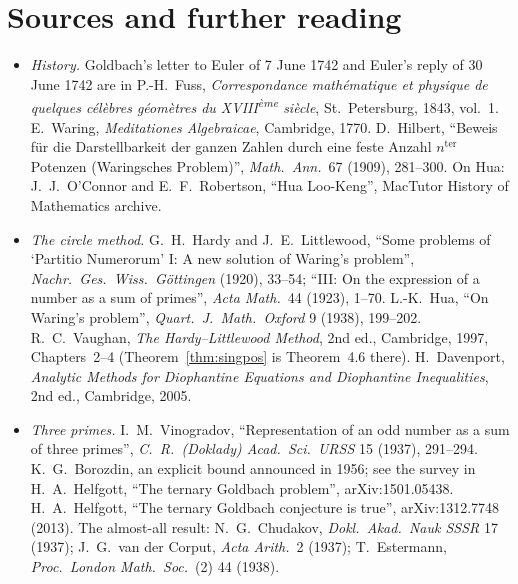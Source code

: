 \section*{Sources and further reading}

\begin{itemize}
\item \emph{History.} Goldbach's letter to Euler of 7 June 1742 and Euler's reply of 30 June 1742 are in P.-H.~Fuss, \emph{Correspondance mathématique et physique de quelques célèbres géomètres du XVIII\textsuperscript{ème} siècle}, St.\ Petersburg, 1843, vol.~1. E.~Waring, \emph{Meditationes Algebraicae}, Cambridge, 1770. D.~Hilbert, ``Beweis für die Darstellbarkeit der ganzen Zahlen durch eine feste Anzahl $n^{\text{ter}}$ Potenzen (Waringsches Problem)'', \emph{Math.\ Ann.}\ 67 (1909), 281--300. On Hua: J.~J.~O'Connor and E.~F.~Robertson, ``Hua Loo-Keng'', MacTutor History of Mathematics archive.
\item \emph{The circle method.} G.~H.~Hardy and J.~E.~Littlewood, ``Some problems of `Partitio Numerorum' I: A new solution of Waring's problem'', \emph{Nachr.\ Ges.\ Wiss.\ Göttingen} (1920), 33--54; ``III: On the expression of a number as a sum of primes'', \emph{Acta Math.}\ 44 (1923), 1--70. L.-K.~Hua, ``On Waring's problem'', \emph{Quart.\ J.\ Math.\ Oxford} 9 (1938), 199--202. R.~C.~Vaughan, \emph{The Hardy--Littlewood Method}, 2nd ed., Cambridge, 1997, Chapters~2--4 (Theorem~\ref{thm:singpos} is Theorem~4.6 there). H.~Davenport, \emph{Analytic Methods for Diophantine Equations and Diophantine Inequalities}, 2nd ed., Cambridge, 2005.
\item \emph{Three primes.} I.~M.~Vinogradov, ``Representation of an odd number as a sum of three primes'', \emph{C.\ R.\ (Doklady) Acad.\ Sci.\ URSS} 15 (1937), 291--294. K.~G.~Borozdin, an explicit bound announced in 1956; see the survey in H.~A.~Helfgott, ``The ternary Goldbach problem'', arXiv:1501.05438. H.~A.~Helfgott, ``The ternary Goldbach conjecture is true'', arXiv:1312.7748 (2013). The almost-all result: N.~G.~Chudakov, \emph{Dokl.\ Akad.\ Nauk SSSR} 17 (1937); J.~G.~van der Corput, \emph{Acta Arith.}\ 2 (1937); T.~Estermann, \emph{Proc.\ London Math.\ Soc.}\ (2) 44 (1938).
\end{itemize}
